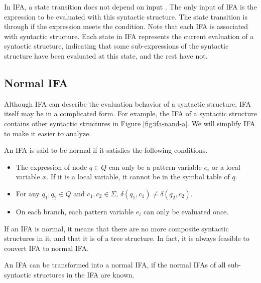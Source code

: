 
In IFA, a state transition does not depend on input . The only input of IFA is the expression to be evaluated with this syntactic structure. The state transition is through if the expression meets the condition. Note that each IFA is associated with syntactic structure. Each state in IFA represents the current evaluation of a syntactic structure, indicating that some sub-expressions of the syntactic structure have been evaluated at this state, and the rest have not.

\subsection{Normal IFA}

Although IFA can describe the evaluation behavior of a syntactic structure, IFA itself may be in a complicated form. For example, the IFA of a syntactic structure contains other syntactic structures in Figure \ref{fig:ifa-nand-a}. We will simplify IFA to make it easier to analyze.

\begin{Def}
    \label{def:nmlifa}
    An IFA is said to be normal if it satisfies the following conditions.
    \begin{itemize}
        \item The expression of node $q \in Q$ can only be a pattern variable $e_i$ or a local variable $x$. If it is a local variable, it cannot be in the symbol table of $q$.
        \item For any $q_1,q_2 \in Q$ and $c_1, c_2 \in \Sigma$, $\delta(q_1, c_1) \neq \delta(q_2, c_2)$.
        \item On each branch, each pattern variable $e_i$ can only be evaluated once.
    \end{itemize}
\end{Def}

If an IFA is normal, it means that there are no more composite syntactic structures in it, and that it is of a tree structure.
In fact, it is always feasible to convert IFA to normal IFA.

\begin{mythm}
    \label{mythm:nmlifa}
    An IFA can be transformed into a normal IFA, if the normal IFAs of all sub-syntactic structures in the IFA are known.
\end{mythm}

